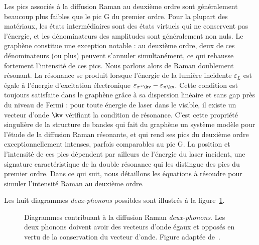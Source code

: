 Les pics associés à la diffusion Raman au deuxième ordre sont généralement beaucoup plus faibles que le pic G du premier ordre. Pour la plupart des matériaux, les états intermédiaires sont des états virtuels qui ne conservent pas l'énergie, et les dénominateurs des amplitudes sont généralement non nuls. Le graphène constitue une exception notable : au deuxième ordre, deux de ces dénominateurs (ou plus) peuvent s'annuler simultanément, ce qui rehausse fortement l'intensité de ces pics. Nous parlons alors de Raman doublement résonant. La résonance se produit lorsque l'énergie de la lumière incidente $\varepsilon_L$ est égale à l'énergie d'excitation électronique $\varepsilon_{\pi^*\kv} - \varepsilon_{\pi\kv}$. Cette condition est toujours satisfaite dans le graphène grâce à sa dispersion linéaire et sans gap près du niveau de Fermi : pour toute énergie de laser dans le visible, il existe un vecteur d'onde $\kv$ vérifiant la condition de résonance. C'est cette propriété singulière de la structure de bandes qui fait du graphène un système modèle pour l'étude de la diffusion Raman résonante, et qui rend ses pics du deuxième ordre exceptionnellement intenses, parfois comparables au pic G. La position et l'intensité de ces pics dépendent par ailleurs de l'énergie du laser incident, une signature caractéristique de la double résonance qui les distingue des pics du premier ordre. Dans ce qui suit, nous détaillons les équations à résoudre pour simuler l'intensité Raman au deuxième ordre. 

Les huit diagrammes \textit{deux-phonons} possibles sont illustrés à la figure~\ref{fig:pp}.

\begin{figure}[htbp]
    \centering
    
    \caption[Diagrammes contribuant à la diffusion Raman \textit{deux-phonons}.]{Diagrammes contribuant à la diffusion Raman \textit{deux-phonons}. Les deux phonons doivent avoir des vecteurs d'onde égaux et opposés en vertu de la conservation du vecteur d'onde. Figure adaptée de~\cite{venezuelaTheoryDoubleresonantRaman2011}.}
    \label{fig:pp}
\end{figure}

